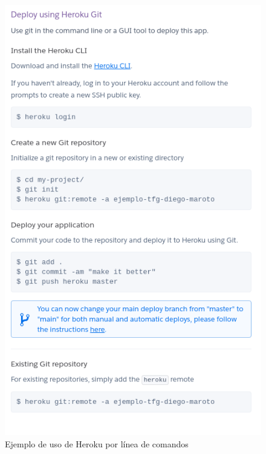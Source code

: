 \begin{figure}[h]
\centering
\includegraphics[scale=0.5]{archivos/heroku03.png}
\caption{Ejemplo de uso de Heroku por línea de comandos}
\end{figure}
\clearpage
\clearpage
